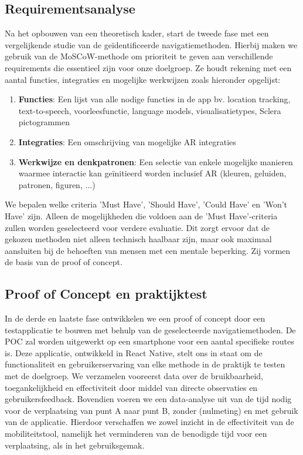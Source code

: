 \subsection*{Requirementsanalyse}

Na het opbouwen van een theoretisch kader, start de tweede fase met een vergelijkende studie van de geïdentificeerde navigatiemethoden. Hierbij maken we gebruik van de MoSCoW-methode om prioriteit te geven aan verschillende requirements die essentieel zijn voor onze doelgroep. Ze houdt rekening met een aantal functies, integraties en mogelijke werkwijzen zoals hieronder opgelijst:

\begin{enumerate}
    \item \textbf{Functies}: Een lijst van alle nodige functies in de app bv. location tracking, text-to-speech, voorleesfunctie, language models, visualisatietypes, Sclera pictogrammen
    \item \textbf{Integraties}: Een omschrijving van mogelijke AR integraties
    \item \textbf{Werkwijze en denkpatronen}: Een selectie van enkele mogelijke manieren waarmee interactie kan geïnitieerd worden inclusief AR (kleuren, geluiden, patronen, figuren, $\ldots$)
\end{enumerate}
    
    We bepalen welke criteria 'Must Have', 'Should Have', 'Could Have' en 'Won't Have' zijn. Alleen de mogelijkheden die voldoen aan de 'Must Have'-criteria zullen worden geselecteerd voor verdere evaluatie. Dit zorgt ervoor dat de gekozen methoden niet alleen technisch haalbaar zijn, maar ook maximaal aansluiten bij de behoeften van mensen met een mentale beperking. Zij vormen de basis van de proof of concept.
    
    \subsection*{Proof of Concept en praktijktest}
    
    In de derde en laatste fase ontwikkelen we een proof of concept door een testapplicatie te bouwen met behulp van de geselecteerde navigatiemethoden. De POC zal worden uitgewerkt op een smartphone voor een aantal specifieke routes is. Deze applicatie, ontwikkeld in React Native, stelt ons in staat om de functionaliteit en gebruikerservaring van elke methode in de praktijk te testen met de doelgroep. We verzamelen vooreerst data over de bruikbaarheid, toegankelijkheid en effectiviteit door middel van directe observaties en gebruikersfeedback. Bovendien voeren we een data-analyse uit van de tijd nodig voor de verplaatsing van punt A naar punt B, zonder (nulmeting) en met gebruik van de applicatie. Hierdoor verschaffen we zowel inzicht in de effectiviteit van de mobiliteitstool, namelijk het verminderen van de benodigde tijd voor een verplaatsing, als in het gebruiksgemak.
    
